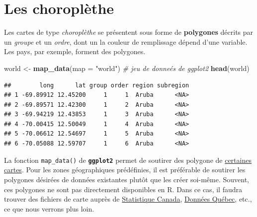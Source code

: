 \documentclass[]{book}
\newenvironment{Shaded}{\begin{snugshade}}{\end{snugshade}}
\newcommand{\CommentTok}[1]{\textcolor[rgb]{0.56,0.35,0.01}{\textit{#1}}}
\newcommand{\DataTypeTok}[1]{\textcolor[rgb]{0.13,0.29,0.53}{#1}}
\newcommand{\KeywordTok}[1]{\textcolor[rgb]{0.13,0.29,0.53}{\textbf{#1}}}
\newcommand{\NormalTok}[1]{#1}
\newcommand{\StringTok}[1]{\textcolor[rgb]{0.31,0.60,0.02}{#1}}
\begin{document}
\hypertarget{les-choropluxe8the}{%
\section{Les choroplèthe}\label{les-choropluxe8the}}

Les cartes de type \emph{choroplèthe} se présentent sous forme de
\textbf{polygones} décrits par un \emph{groupe} et un \emph{ordre}, dont
un la couleur de remplissage dépend d'une variable. Les pays, par
exemple, forment des polygones.

\begin{Shaded}
\begin{Highlighting}[]
\NormalTok{world <-}\StringTok{ }\KeywordTok{map_data}\NormalTok{(}\DataTypeTok{map =} \StringTok{"world"}\NormalTok{) }\CommentTok{# jeu de donneés de ggplot2}
\KeywordTok{head}\NormalTok{(world)}
\end{Highlighting}
\end{Shaded}

\begin{verbatim}
##        long      lat group order region subregion
## 1 -69.89912 12.45200     1     1  Aruba      <NA>
## 2 -69.89571 12.42300     1     2  Aruba      <NA>
## 3 -69.94219 12.43853     1     3  Aruba      <NA>
## 4 -70.00415 12.50049     1     4  Aruba      <NA>
## 5 -70.06612 12.54697     1     5  Aruba      <NA>
## 6 -70.05088 12.59707     1     6  Aruba      <NA>
\end{verbatim}

La fonction \texttt{map\_data()} de \textbf{\texttt{ggplot2}} permet de
soutirer des polygone de
\href{https://www.rdocumentation.org/packages/ggplot2/versions/3.1.0/topics/map_data}{certaines
cartes}. Pour les zones géographiques prédéfinies, il est préférable de
soutirer les polygones désirées de données existantes plutôt que les
créer soi-même. Souvent, ces polygones ne sont pas directement
disponibles en R. Dans ce cas, il faudra trouver des fichiers de carte
auprès de \href{https://www.statcan.gc.ca/fra/debut}{Statistique
Canada}, \href{https://www.donneesquebec.ca}{Données Québec}, etc., ce
que nous verrons plus loin.
\end{document}
